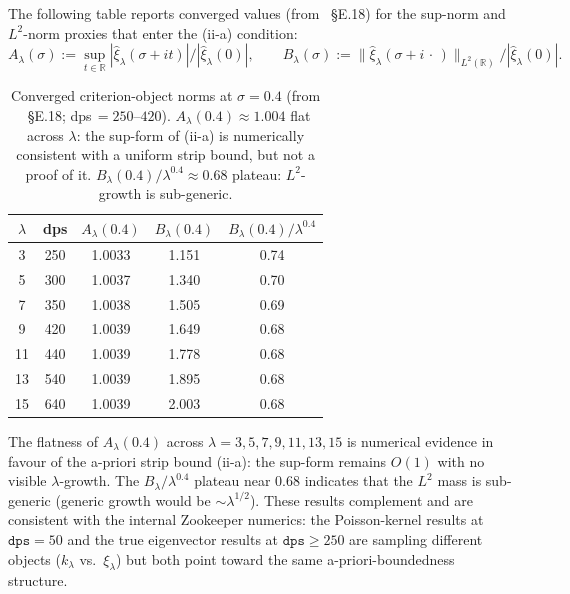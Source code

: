 \documentclass[12pt,a4paper]{article}
\theoremstyle{definition}
\theoremstyle{remark}
\begin{document}
The following table reports converged values (from \cite{Geiger2026evendom}~§E.18)
for the sup-norm and $L^2$-norm proxies that enter the (ii-a) condition:
\begin{equation}
  A_\lambda(\sigma) := \sup_{t\in\mathbb{R}} |\hat{\xi}_\lambda(\sigma+it)|
  / |\hat{\xi}_\lambda(0)|,
  \qquad
  B_\lambda(\sigma) := \|\hat{\xi}_\lambda(\sigma+i\,\cdot\,)\|_{L^2(\mathbb{R})}
  / |\hat{\xi}_\lambda(0)|.
\end{equation}

\begin{table}[h]
\centering
\caption{Converged criterion-object norms at $\sigma=0.4$
  (from \cite{Geiger2026evendom}~§E.18; dps\,$=250$--$420$).
  $A_\lambda(0.4)\approx 1.004$ flat across $\lambda$: the sup-form of
  (ii-a) is numerically consistent with a uniform strip bound, but not
  a proof of it.  $B_\lambda(0.4)/\lambda^{0.4}
  \approx 0.68$ plateau: $L^2$-growth is sub-generic.}
\label{tab:evendom-norms}
\begin{tabular}{ccccc}
\toprule
$\lambda$ & dps & $A_\lambda(0.4)$ & $B_\lambda(0.4)$ &
  $B_\lambda(0.4)/\lambda^{0.4}$ \\
\midrule
3  & 250 & 1.0033 & 1.151 & 0.74 \\
5  & 300 & 1.0037 & 1.340 & 0.70 \\
7  & 350 & 1.0038 & 1.505 & 0.69 \\
9  & 420 & 1.0039 & 1.649 & 0.68 \\
11 & 440 & 1.0039 & 1.778 & 0.68 \\
13 & 540 & 1.0039 & 1.895 & 0.68 \\
15 & 640 & 1.0039 & 2.003 & 0.68 \\
\bottomrule
\end{tabular}
\end{table}

The flatness of $A_\lambda(0.4)$ across $\lambda = 3, 5, 7, 9, 11, 13, 15$ is
numerical evidence in favour of the a-priori strip bound (ii-a):
the sup-form remains $O(1)$ with no visible $\lambda$-growth.  The
$B_\lambda/\lambda^{0.4}$ plateau near $0.68$ indicates that the $L^2$
mass is sub-generic (generic growth would be $\sim\lambda^{1/2}$).
These results complement and are consistent with the internal Zookeeper
numerics: the Poisson-kernel results at $\mathtt{dps}=50$ and the true
eigenvector results at $\mathtt{dps}\ge 250$ are sampling different objects
($k_\lambda$ vs.\ $\xi_\lambda$) but both point toward the same
a-priori-boundedness structure.
\end{document}
